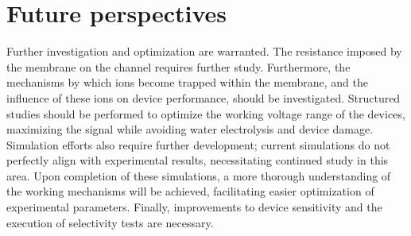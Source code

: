 \section*{Future perspectives}

Further investigation and optimization are warranted. The resistance imposed by the membrane on the channel requires further study. Furthermore, the mechanisms by which ions become trapped within the membrane, and the influence of these ions on device performance, should be investigated. Structured studies should be performed to optimize the working voltage range of the devices, maximizing the signal while avoiding water electrolysis and device damage. Simulation efforts also require further development; current simulations do not perfectly align with experimental results, necessitating continued study in this area. Upon completion of these simulations, a more thorough understanding of the working mechanisms will be achieved, facilitating easier optimization of experimental parameters. Finally, improvements to device sensitivity and the execution of selectivity tests are necessary.

\newpage
\thispagestyle{empty}
\ %
\newpage